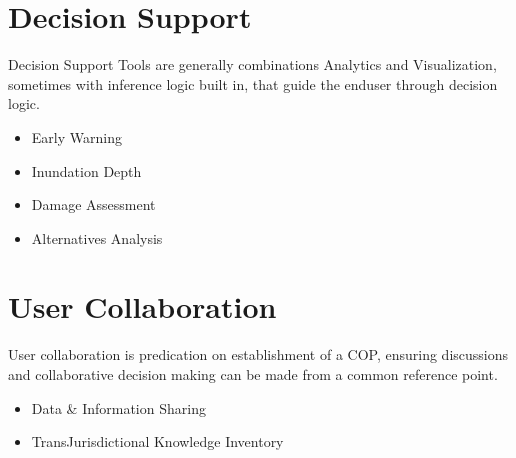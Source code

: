 \documentclass[letterpaper,10pt,english]{sphinxmanual}
\begin{document}
\section{Decision Support}
\label{\detokenize{requirements/wisdom/dss:decision-support}}\label{\detokenize{requirements/wisdom/dss::doc}}
\sphinxAtStartPar
Decision Support Tools are generally combinations Analytics and Visualization,
sometimes with inference logic built in, that guide the end\sphinxhyphen{}user through
decision logic.
\begin{itemize}
\item {} 
\sphinxAtStartPar
Early Warning

\item {} 
\sphinxAtStartPar
Inundation Depth

\item {} 
\sphinxAtStartPar
Damage Assessment

\item {} 
\sphinxAtStartPar
Alternatives Analysis

\end{itemize}


\section{User Collaboration}
\label{\detokenize{requirements/wisdom/collaboration:user-collaboration}}\label{\detokenize{requirements/wisdom/collaboration::doc}}
\sphinxAtStartPar
User collaboration is predication on establishment of a COP, ensuring
discussions and collaborative decision making can be made from a common
reference point.
\begin{itemize}
\item {} 
\sphinxAtStartPar
Data \& Information Sharing

\item {} 
\sphinxAtStartPar
Trans\sphinxhyphen{}Jurisdictional Knowledge Inventory

\end{itemize}
\end{document}
